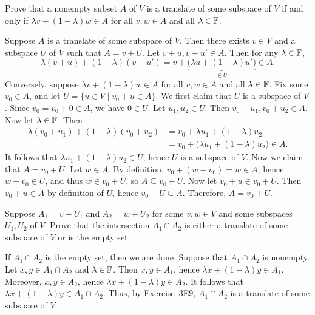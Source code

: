 \begin{exc}
\begin{exercise}
Prove that a nonempty subset $A$ of $V$ is a translate of some subspace of $V$
if and only if $\lambda v+(1-\lambda)w\in A$ for all $v,w\in A$ and all
$\lambda\in\mathbb{F}$.
\end{exercise}
\begin{solution}
Suppose $A$ is a translate of some subspace of $V$. Then there exists $v\in V$
and a subspace $U$ of $V$ such that $A=v+U$. Let $v+u,v+u'\in A$. Then for any
$\lambda\in\mathbb{F}$,
\[ \lambda(v+u)+(1-\lambda)(v+u')
   = v+\underbrace{\bigl(\lambda u+(1-\lambda)u'\bigr)}_{\in U}\in A. \]
Conversely, suppose $\lambda v+(1-\lambda)w\in A$ for all $v,w\in A$ and all
$\lambda\in\mathbb{F}$. Fix some $v_0\in A$, and let $U=\{u\in V \mid v_0+u\in A\}$. We
first claim that $U$ is a subspace of $V$. Since $v_0=v_0+0\in A$, we have
$0\in U$. Let $u_1,u_2\in U$. Then $v_0+u_1,v_0+u_2\in A$. Now let
$\lambda\in\mathbb{F}$. Then
\begin{align*}
\lambda(v_0+u_1)+(1-\lambda)(v_0+u_2) &= v_0+\lambda u_1+(1-\lambda)u_2\\
  &= v_0+\bigl(\lambda u_1+(1-\lambda)u_2\bigr)\in A.
\end{align*}
It follows that $\lambda u_1+(1-\lambda)u_2\in U$, hence $U$ is a subspace of
$V$. Now we claim that $A=v_0+U$. Let $w\in A$. By definition,
$v_0+(w-v_0)=w\in A$, hence $w-v_0\in U$, and thus $w\in v_0+U$, so
$A\subseteq v_0+U$. Now let $v_0+u\in v_0+U$. Then $v_0+u\in A$ by definition of
$U$, hence $v_0+U\subseteq A$. Therefore, $A=v_0+U$.
\end{solution}

\begin{exercise}
Suppose $A_1=v+U_1$ and $A_2=w+U_2$ for some $v,w\in V$ and some subspaces
$U_1,U_2$ of $V$. Prove that the intersection $A_1\cap A_2$ is either a
translate of some subspace of $V$ or is the empty set.
\end{exercise}
\begin{solution}
If $A_1\cap A_2$ is the empty set, then we are done. Suppose that $A_1\cap A_2$
is nonempty. Let $x,y\in A_1\cap A_2$ and $\lambda\in\mathbb{F}$. Then $x,y\in A_1$,
hence $\lambda x+(1-\lambda)y\in A_1$. Moreover, $x,y\in A_2$, hence
$\lambda x+(1-\lambda)y\in A_2$. It follows that
$\lambda x+(1-\lambda)y\in A_1\cap A_2$. Thus, by Exercise~3E9, $A_1\cap A_2$ is
a translate of some subspace of $V$.
\end{solution}


\end{exc}
